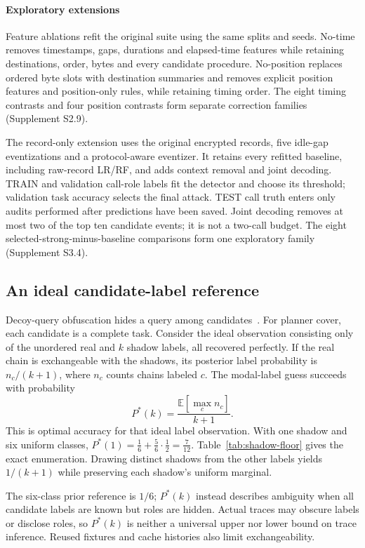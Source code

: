 \paragraph{Exploratory extensions}
Feature ablations refit the original suite using the same splits and seeds. No-time removes timestamps, gaps, durations and elapsed-time features while retaining destinations, order, bytes and every candidate procedure. No-position replaces ordered byte slots with destination summaries and removes explicit position features and position-only rules, while retaining timing order. The eight timing contrasts and four position contrasts form separate correction families (Supplement S2.9).

The record-only extension uses the original encrypted records, five idle-gap eventizations and a protocol-aware eventizer. It retains every refitted baseline, including raw-record LR/RF, and adds context removal and joint decoding. TRAIN and validation call-role labels fit the detector and choose its threshold; validation task accuracy selects the final attack. TEST call truth enters only audits performed after predictions have been saved. Joint decoding removes at most two of the top ten candidate events; it is not a two-call budget. The eight selected-strong-minus-baseline comparisons form one exploratory family (Supplement S3.4).

\subsection{An ideal candidate-label reference}\label{sec:floor}
Decoy-query obfuscation hides a query among candidates~\cite{domingoferrer2009goopir}. For planner cover, each candidate is a complete task. Consider the ideal observation consisting only of the unordered real and $k$ shadow labels, all recovered perfectly. If the real chain is exchangeable with the shadows, its posterior label probability is $n_c/(k+1)$, where $n_c$ counts chains labeled $c$. The modal-label guess succeeds with probability
\[P^*(k)=\frac{\mathbb{E}[\max_c n_c]}{k+1}.\]
This is optimal accuracy for that ideal label observation. With one shadow and six uniform classes, $P^*(1)=\tfrac16+\tfrac56\cdot\tfrac12=\tfrac7{12}$. Table~\ref{tab:shadow-floor} gives the exact enumeration. Drawing distinct shadows from the other labels yields $1/(k+1)$ while preserving each shadow's uniform marginal.

The six-class prior reference is $1/6$; $P^*(k)$ instead describes ambiguity when all candidate labels are known but roles are hidden. Actual traces may obscure labels or disclose roles, so $P^*(k)$ is neither a universal upper nor lower bound on trace inference. Reused fixtures and cache histories also limit exchangeability.


